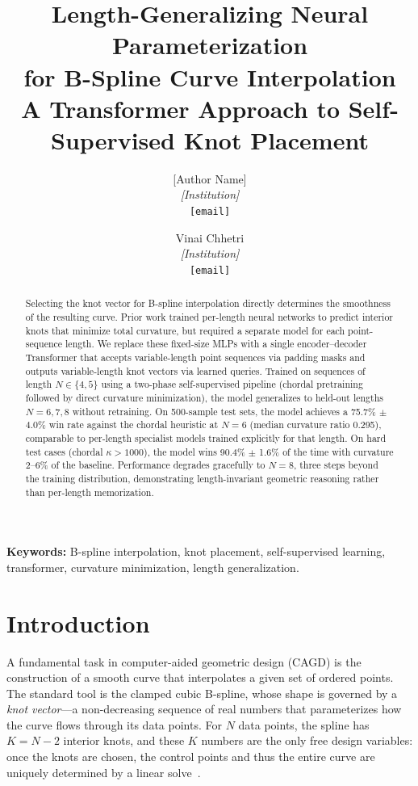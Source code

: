 \documentclass[11pt, a4paper]{article}
\title{%
  \textbf{Length-Generalizing Neural Parameterization\\
  for B-Spline Curve Interpolation}\\[6pt]
  \large A Transformer Approach to Self-Supervised Knot Placement
}
\author{%
  [Author Name]\\
  \textit{[Institution]}\\
  \texttt{[email]}
  \and
  Vinai Chhetri\\
  \textit{[Institution]}\\
  \texttt{[email]}
}
\date{}
\begin{document}
\maketitle

\begin{abstract}
Selecting the knot vector for B-spline interpolation directly determines the
smoothness of the resulting curve. Prior work trained per-length neural
networks to predict interior knots that minimize total curvature, but
required a separate model for each point-sequence length. We replace these
fixed-size MLPs with a single encoder--decoder Transformer that accepts
variable-length point sequences via padding masks and outputs variable-length
knot vectors via learned queries. Trained on sequences of length $N \in
\{4,5\}$ using a two-phase self-supervised pipeline (chordal pretraining
followed by direct curvature minimization), the model generalizes to
held-out lengths $N = 6, 7, 8$ without retraining. On 500-sample test sets,
the model achieves a 75.7\% $\pm$ 4.0\% win rate against the chordal
heuristic at $N = 6$ (median curvature ratio 0.295), comparable to per-length
specialist models trained explicitly for that length. On hard test cases
(chordal $\kappa > 1000$), the model wins 90.4\% $\pm$ 1.6\% of the time
with curvature 2--6\% of the baseline. Performance degrades gracefully to
$N = 8$, three steps beyond the training distribution, demonstrating
length-invariant geometric reasoning rather than per-length memorization.
\end{abstract}

\vspace{4pt}
\noindent\textbf{Keywords:}
B-spline interpolation, knot placement, self-supervised learning,
transformer, curvature minimization, length generalization.


\section{Introduction}
\label{sec:intro}

A fundamental task in computer-aided geometric design (CAGD) is the
construction of a smooth curve that interpolates a given set of ordered
points. The standard tool is the clamped cubic B-spline, whose shape is
governed by a \emph{knot vector}---a non-decreasing sequence of real numbers
that parameterizes how the curve flows through its data points. For $N$ data
points, the spline has $K = N - 2$ interior knots, and these $K$ numbers are
the only free design variables: once the knots are chosen, the control
points and thus the entire curve are uniquely determined by a linear
solve~\cite{deBoor1978}.
\end{document}
